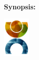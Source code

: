 \hfill
\begin{minipage}[r]{0.50\textwidth}
	{\textbf{Synopsis:}} \\
	\fbox{\parbox[c]{\textwidth-0.5em}{
	\bigskip
	{\vfill{\small 
	\bigskip}}
    }}
\end{minipage}
\vfill
\begin{center}
	\includegraphics[width=1.35cm]{frontmatter/ca-logo.pdf}
\end{center}
\restoregeometry


